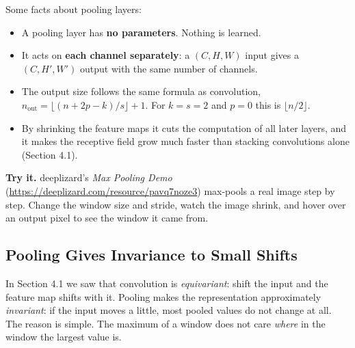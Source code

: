 \documentclass[12pt, a4paper]{article}
\begin{document}
Some facts about pooling layers:
\begin{itemize}
  \item A pooling layer has \textbf{no parameters}. Nothing is learned.
  \item It acts on \textbf{each channel separately}: a $(C, H, W)$ input gives
        a $(C, H', W')$ output with the same number of channels.
  \item The output size follows the same formula as convolution,
        $n_{\text{out}} = \lfloor (n + 2p - k)/s \rfloor + 1$. For $k = s = 2$
        and $p = 0$ this is $\lfloor n/2 \rfloor$.
  \item By shrinking the feature maps it cuts the computation of all later
        layers, and it makes the receptive field grow much faster than
        stacking convolutions alone (Section 4.1).
\end{itemize}

\begin{notebox}
  \textbf{Try it.} deeplizard's \emph{Max Pooling Demo}
  (\url{https://deeplizard.com/resource/pavq7noze3}) max-pools a real image
  step by step. Change the window size and stride, watch the image shrink,
  and hover over an output pixel to see the window it came from.
\end{notebox}

\subsection{Pooling Gives Invariance to Small Shifts}

In Section 4.1 we saw that convolution is \emph{equivariant}: shift the
input and the feature map shifts with it. Pooling makes the representation
approximately \emph{invariant}: if the input moves a little, most pooled
values do not change at all. The reason is simple. The maximum of a window does
not care \emph{where} in the window the largest value is.
\end{document}

